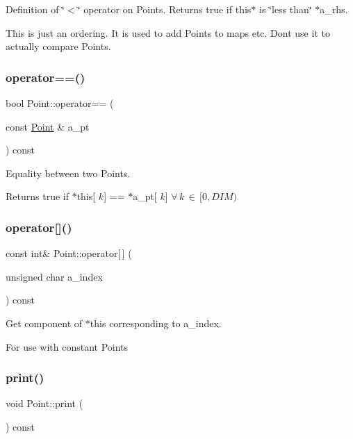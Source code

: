 Definition of \char`\"{}$<$\char`\"{} operator on Points. Returns true if this$\ast$ is \char`\"{}less than\char`\"{} $\ast$a\+\_\+rhs. 

This is just an ordering. It is used to add Points to maps etc. Don\textquotesingle{}t use it to actually compare Points. \mbox{\label{class_point_a8cf841adb026628dda2df391952ece75}} 
\subsubsection{\texorpdfstring{operator==()}{operator==()}}
{\footnotesize\ttfamily bool Point\+::operator== (\begin{DoxyParamCaption}\item[{const \hyperlink{class_point}{Point} \&}]{a\+\_\+pt }\end{DoxyParamCaption}) const\hspace{0.3cm}{\ttfamily [inline]}}



Equality between two Points. 

Returns true if $\ast$this\mbox{[} $k$\mbox{]} == $\ast$a\+\_\+pt\mbox{[} $k$\mbox{]} $\forall\,k\,\in\,[0,DIM)$ \mbox{\label{class_point_a267f1f8120637239e6486bdae0ad48e0}} 
\subsubsection{\texorpdfstring{operator[]()}{operator[]()}}
{\footnotesize\ttfamily const int\& Point\+::operator\mbox{[}$\,$\mbox{]} (\begin{DoxyParamCaption}\item[{unsigned char}]{a\+\_\+index }\end{DoxyParamCaption}) const\hspace{0.3cm}{\ttfamily [inline]}}



Get component of $\ast$this corresponding to a\+\_\+index. 

For use with constant Points \mbox{\label{class_point_ae1b141ad286025fc7b4183cc27ef8c0d}} 
\subsubsection{\texorpdfstring{print()}{print()}}
{\footnotesize\ttfamily void Point\+::print (\begin{DoxyParamCaption}{ }\end{DoxyParamCaption}) const\hspace{0.3cm}{\ttfamily [inline]}}



